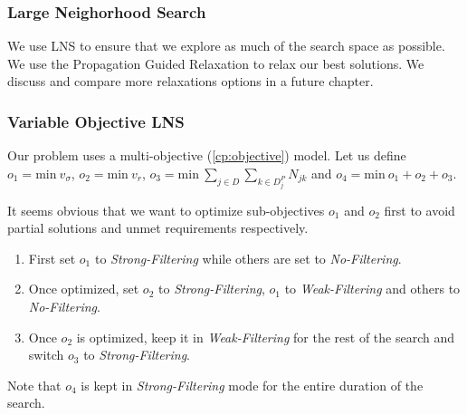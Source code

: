 \documentclass[../../thesis.tex]{subfiles}
\begin{document}
\subsubsection{Large Neighorhood Search}

We use LNS to ensure that we explore as much of the search space as possible. 
We use the Propagation Guided Relaxation \cite{Propagation:LNS} to relax our best solutions.
We discuss and compare more relaxations options in a future chapter.

\subsubsection{Variable Objective LNS}

Our problem uses a multi-objective (\ref{cp:objective}) model. 
Let us define $o_1 = \text{min} \ v_{\sigma}$, $o_2 = {\text{min} \ v_r}$, $o_3 = {\text{min} \ \sum_{j \in D} \sum_{k \in D^P_j} N_{jk}}$
and $o_4 = \text{min} \ o_1 + o_2 + o_3$.


It seems obvious that we want 
to optimize sub-objectives $o_1$ and $o_2$ first to avoid partial solutions and unmet requirements respectively. 

\begin{enumerate}
  \item First set $o_1$ to \emph{Strong-Filtering} while others are set to \emph{No-Filtering}.
  \item Once optimized, set $o_2$ to \emph{Strong-Filtering}, $o_1$ to \emph{Weak-Filtering} and others to \emph{No-Filtering}.
  \item Once $o_2$ is optimized, keep it in \emph{Weak-Filtering} for the rest of the search and switch $o_3$ to \emph{Strong-Filtering}.
\end{enumerate}

Note that $o_4$ is kept in \emph{Strong-Filtering} mode for the entire duration of the search.
\end{document}
